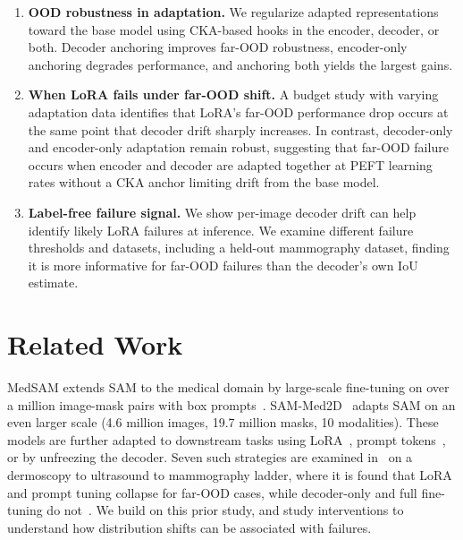 \documentclass[runningheads]{llncs}
\begin{document}
\begin{enumerate}
  \item \textbf{OOD robustness in adaptation.} We regularize adapted representations toward the base model using CKA-based hooks in the encoder, decoder, or both. Decoder anchoring improves far-OOD robustness, encoder-only anchoring degrades performance, and anchoring both yields the largest gains.
  \item \textbf{When LoRA fails under far-OOD shift.} A budget study with varying adaptation data identifies that LoRA's far-OOD performance drop occurs at the same point that decoder drift sharply increases. In contrast, decoder-only and encoder-only adaptation remain robust, suggesting that far-OOD failure occurs when encoder and decoder are adapted together at PEFT learning rates without a CKA anchor limiting drift from the base model.
  \item \textbf{Label-free failure signal.} We show per-image decoder drift can help identify likely LoRA failures at inference. We examine different failure thresholds and datasets, including a held-out mammography dataset, finding it is more informative for far-OOD failures than the decoder's own IoU estimate.
\end{enumerate}

\section{Related Work}
\label{sec:related}

MedSAM extends SAM to the medical domain by large-scale fine-tuning on over a million image-mask pairs with box prompts~\cite{ma2024medsam}. SAM-Med2D~\cite{cheng2023sammed2d} adapts SAM on an even larger scale (4.6 million images, 19.7 million masks, 10 modalities). These models are further adapted to downstream tasks using LoRA~\cite{hu2022lora}, prompt tokens~\cite{jia2022vpt}, or by unfreezing the decoder. Seven such strategies are examined in~\cite{prior2026safer} on a dermoscopy to ultrasound to mammography ladder, where it is found that LoRA and prompt tuning collapse for far-OOD cases, while decoder-only and full fine-tuning do not~\cite{prior2026safer}. We build on this prior study, and study interventions to understand how distribution shifts can be associated with failures.
\end{document}
